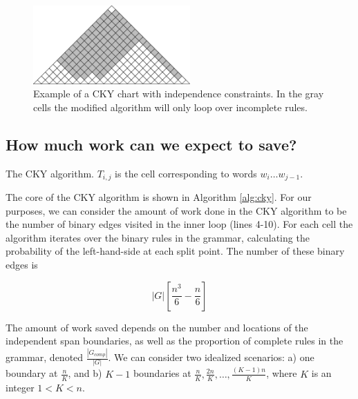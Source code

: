 \documentclass[11pt]{article}
\begin{document}
\begin{figure}[t]
  \centering
  \includegraphics[width=6cm]{chart-constraints}
  \caption{Example of a CKY chart with independence constraints. In the gray cells the modified algorithm will only loop over incomplete rules. \label{fig:chart}}
\end{figure}

\subsection{How much work can we expect to save?}
\label{sec-3-1}
\label{sec:comp-saved}

\begin{algorithm}[t]
  \caption{The CKY algorithm. $T_{i,j}$ is the cell corresponding to words $w_i \dots w_{j-1}$.\label{alg:cky}}
  \DontPrintSemicolon
\end{algorithm}

The core of the CKY algorithm is shown in Algorithm \ref{alg:cky}. For our
purposes, we can consider the amount of work done in the CKY algorithm to be the
number of binary edges visited in the inner loop (lines 4-10). For each cell the
algorithm iterates over the binary rules in the grammar, calculating the
probability of the left-hand-side at each split point. The number of these
binary edges is

\begin{equation}
|G|\left[\frac{n^3}{6} - \frac{n}{6}\right]
\end{equation}

The amount of work saved depends on the number and locations of the
independent span boundaries, as well as the proportion of
complete rules in the grammar, denoted $\frac{|G_{comp}|}{|G|}$. We
can consider two idealized scenarios: a) one boundary at $\frac{n}{K}$,
and b) $K-1$ boundaries at $\frac{n}{K}, \frac{2n}{K}, \dots,
\frac{(K-1)n}{K}$, where $K$ is an integer $1 < K < n$.
\end{document}
